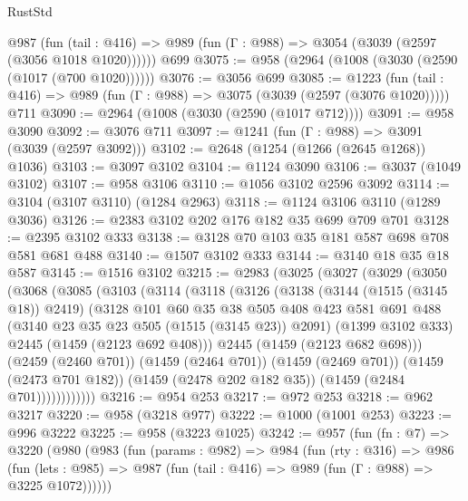\begin{lexlean}{RustStd}
\begin{coremodule}
    @987 (fun (tail : @416) => @989 (fun (Γ : @988) => @3054 (@3039 (@2597 (@3056 @1018 @1020))))))
    @699
@3075 := @958 (@2964 (@1008 (@3030 (@2590 (@1017 (@700 @1020))))))
@3076 := @3056 @699
@3085 := @1223
    (fun (tail : @416) => @989 (fun (Γ : @988) => @3075 (@3039 (@2597 (@3076 @1020)))))
    @711
@3090 := @2964 (@1008 (@3030 (@2590 (@1017 @712))))
@3091 := @958 @3090
@3092 := @3076 @711
@3097 := @1241 (fun (Γ : @988) => @3091 (@3039 (@2597 @3092)))
@3102 := @2648 (@1254 (@1266 (@2645 @1268)) @1036)
@3103 := @3097 @3102
@3104 := @1124 @3090
@3106 := @3037 (@1049 @3102)
@3107 := @958 @3106
@3110 := @1056 @3102 @2596 @3092
@3114 := @3104 (@3107 @3110) (@1284 @2963)
@3118 := @1124 @3106 @3110 (@1289 @3036)
@3126 := @2383 @3102 @202 @176 @182 @35 @699 @709 @701
@3128 := @2395 @3102 @333
@3138 := @3128 @70 @103 @35 @181 @587 @698 @708 @581 @681 @488
@3140 := @1507 @3102 @333
@3144 := @3140 @18 @35 @18 @587
@3145 := @1516 @3102
@3215 := @2983
    (@3025
      (@3027
        (@3029
          (@3050
            (@3068
              (@3085
                (@3103
                  (@3114
                    (@3118
                      (@3126
                        (@3138
                          (@3144 (@1515 (@3145 @18)) @2419)
                          (@3128
                            @101
                            @60
                            @35
                            @38
                            @505
                            @408
                            @423
                            @581
                            @691
                            @488
                            (@3140 @23 @35 @23 @505 (@1515 (@3145 @23)) @2091)
                            (@1399 @3102 @333)
                            @2445
                            (@1459 (@2123 @692 @408)))
                          @2445
                          (@1459 (@2123 @682 @698)))
                        (@2459 (@2460 @701))
                        (@1459 (@2464 @701))
                        (@1459 (@2469 @701))
                        (@1459 (@2473 @701 @182))
                        (@1459 (@2478 @202 @182 @35))
                        (@1459 (@2484 @701))))))))))))
@3216 := @954 @253
@3217 := @972 @253
@3218 := @962 @3217
@3220 := @958 (@3218 @977)
@3222 := @1000 (@1001 @253)
@3223 := @996 @3222
@3225 := @958 (@3223 @1025)
@3242 := @957
    (fun (fn : @7) =>
    @3220
      (@980
        (@983
          (fun (params : @982) =>
          @984
            (fun (rty : @316) =>
            @986
              (fun (lets : @985) =>
              @987 (fun (tail : @416) => @989 (fun (Γ : @988) => @3225 @1072))))))

\end{coremodule}
\end{lexlean}
